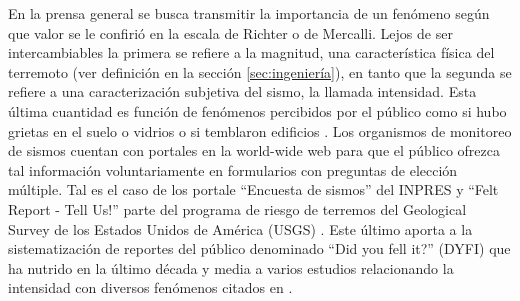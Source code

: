 \documentclass[a4paper]{report}
\begin{document}
%
%

En la prensa general se busca transmitir la importancia de un fenómeno según que valor se le confirió en la escala de Richter o de Mercalli.
Lejos de ser intercambiables la primera se refiere a la magnitud, una característica física del terremoto (ver definición en la sección \ref{sec:ingeniería}), en tanto que la segunda se refiere a una caracterización subjetiva del sismo, la llamada intensidad.
Esta última cuantidad es función de fenómenos percibidos por el público como si hubo grietas en el suelo o vidrios o si temblaron edificios \cite[sección 4.2.3]{fowler_solid_1990}.
Los organismos de monitoreo de sismos cuentan con portales en la world-wide web para que el público ofrezca tal información voluntariamente en formularios con preguntas de elección múltiple.
Tal es el caso de los portale ``Encuesta de sismos'' del INPRES \cite{noauthor_encuesta_nodate} y ``Felt Report - Tell Us!'' \cite{noauthor_felt_nodate} parte del programa de riesgo de terremos del Geological Survey de los Estados Unidos de América (USGS) \cite{david_jay_usgs_2012}. 
Este último aporta a la sistematización de reportes del público denominado ``Did you fell it?'' (DYFI) que ha nutrido en la último década y media a varios estudios relacionando la intensidad con diversos fenómenos citados en \cite{noauthor_dyfi_nodate}.
\end{document}

